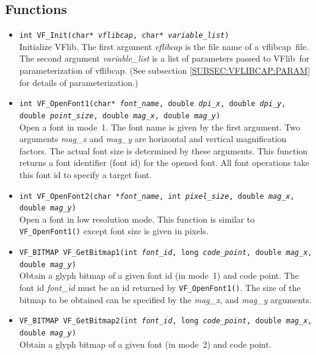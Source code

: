 \documentclass{cah-gut}
\newcommand{\pkg}[1]{\textsf{#1}}
\newcommand{\prog}[1]{\texttt{#1}}
\newcommand{\var}[1]{\textit{#1}}
\newcommand{\VFlib}{\pkg{VFlib}}
\newcommand{\vflibcap}{\pkg{vflibcap}}
\begin{document}
\subsection{Functions}

\begin{itemize}
\item \prog{int VF\_Init(char* \var{vflibcap},
                         char* \var{variable\_list})} \\
  Initialize \VFlib.  The first argument \var{vflibcap} is the file name
  of a \vflibcap\ file.  The second argument {\it variable\_list} is a 
  list of parameters passed to \VFlib\ for parameterization of \vflibcap.
  (See subsection \ref{SUBSEC:VFLIBCAP:PARAM} for details of
  parameterization.)

\item \prog{int  VF\_OpenFont1(char* \var{font\_name},
                               double \var{dpi\_x},
                               double \var{dpi\_y}, 
                               double \var{point\_size}, 
                               double \var{mag\_x},
                               double \var{mag\_y})} \\
  Open a font in mode~1.  The font name is given by the first
  argument.  Two arguments \var{mag\_x} and \var{mag\_y} are
  horizontal and vertical magnification factors.  The actual font size
  is determined by these arguments.  This function returns a font
  identifier (font id) for the opened font.  All font operations take
  this font id to specify a target font.

\item \prog{int VF\_OpenFont2(char *\var{font\_name},
                              int \var{pixel\_size},  
                              double \var{mag\_x}, 
                              double \var{mag\_y})} \\
  Open a font in low resolution mode.  This function is similar to
  \prog{VF\_OpenFont1()} except font size is given in pixels.

\item \prog{VF\_BITMAP  VF\_GetBitmap1(int \var{font\_id}, 
                                       long \var{code\_point},
                                       double \var{mag\_x}, 
                                       double \var{mag\_y})} \\
  Obtain a glyph bitmap of a given font id (in mode~1) and code point.
  The font id \var{font\_id} must be an id returned by
  \prog{VF\_OpenFont1()}.  The size of the bitmap to be obtained can
  be specified by the \var{mag\_x}, and \var{mag\_y} arguments.  

\item \prog{VF\_BITMAP  VF\_GetBitmap2(int \var{font\_id}, 
                                       long \var{code\_point},
                                       double \var{mag\_x},
                                       double \var{mag\_y})} \\
  Obtain a glyph bitmap of a given font (in mode~2) and code point.
\end{itemize}
\end{document}
